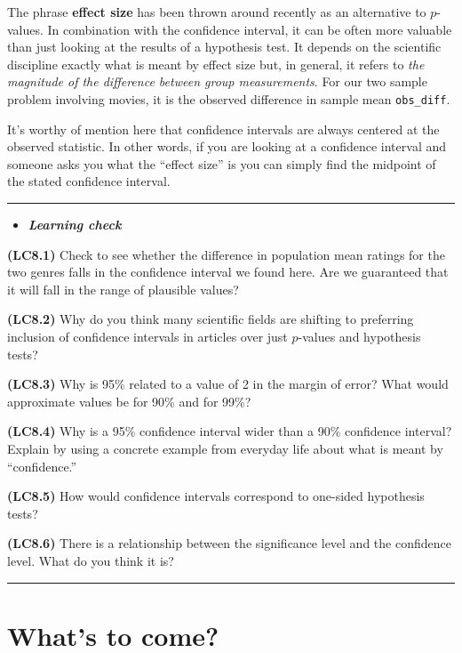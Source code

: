 \documentclass[]{tufte-book}
\newenvironment{rmdblock}[1]
  {\begin{shaded*}
  \begin{itemize}
  \renewcommand{\labelitemi}{
    \raisebox{-.7\height}[0pt][0pt]{
    }
  }
  \item
  }
  {
  \end{itemize}
  \end{shaded*}
  }
\newenvironment{learncheck}
  {\begin{rmdblock}{warning}}
  {\end{rmdblock}}
\begin{document}
The phrase \textbf{effect size} has been thrown around recently as an
alternative to \(p\)-values. In combination with the confidence
interval, it can be often more valuable than just looking at the results
of a hypothesis test. It depends on the scientific discipline exactly
what is meant by effect size but, in general, it refers to \emph{the
magnitude of the difference between group measurements}. For our two
sample problem involving movies, it is the observed difference in sample
mean \texttt{obs\_diff}.

It's worthy of mention here that confidence intervals are always
centered at the observed statistic. In other words, if you are looking
at a confidence interval and someone asks you what the ``effect size''
is you can simply find the midpoint of the stated confidence interval.

\begin{center}\rule{\linewidth}{\linethickness}\end{center}\begin{learncheck}
\textbf{\emph{Learning check}}
\end{learncheck}

\textbf{(LC8.1)} Check to see whether the difference in population mean
ratings for the two genres falls in the confidence interval we found
here. Are we guaranteed that it will fall in the range of plausible
values?

\textbf{(LC8.2)} Why do you think many scientific fields are shifting to
preferring inclusion of confidence intervals in articles over just
\(p\)-values and hypothesis tests?

\textbf{(LC8.3)} Why is 95\% related to a value of 2 in the margin of
error? What would approximate values be for 90\% and for 99\%?

\textbf{(LC8.4)} Why is a 95\% confidence interval wider than a 90\%
confidence interval? Explain by using a concrete example from everyday
life about what is meant by ``confidence.''

\textbf{(LC8.5)} How would confidence intervals correspond to one-sided
hypothesis tests?

\textbf{(LC8.6)} There is a relationship between the significance level
and the confidence level. What do you think it is?

\begin{center}\rule{\linewidth}{\linethickness}\end{center}

\section{What's to come?}\label{whats-to-come-5}
\end{document}
